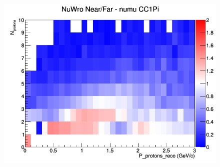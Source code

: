 \begin{figure}[h]
\endminipage
{}
\includegraphics[width=\linewidth]{eff_N_P/FGT/protons/ratios/CC1Pi_NuWro_numu_NF_N_P.png}
\endminipage
\newline
\end{figure}
\clearpage
